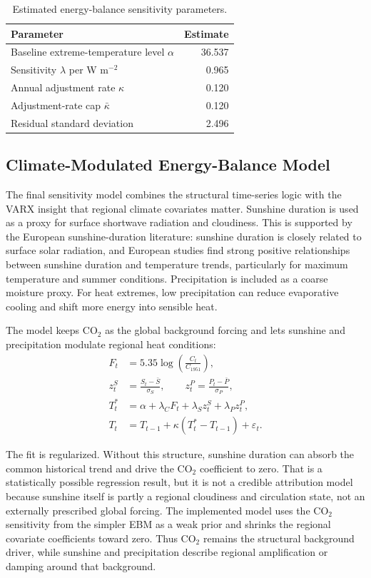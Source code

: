 \documentclass[11pt,a4paper]{article}
\begin{document}
\begin{table}[htbp]
  \centering
  \caption{Estimated energy-balance sensitivity parameters.}
  \label{tab:ebm-parameters}
  \begin{tabular}{lr}
    \toprule
    Parameter & Estimate \\
    \midrule
    Baseline extreme-temperature level $\alpha$ & 36.537 \\
    Sensitivity $\lambda$ per W m$^{-2}$ & 0.965 \\
    Annual adjustment rate $\kappa$ & 0.120 \\
    Adjustment-rate cap $\bar{\kappa}$ & 0.120 \\
    Residual standard deviation & 2.496 \\
    \bottomrule
  \end{tabular}
\end{table}

\subsection{Climate-Modulated Energy-Balance Model}

The final sensitivity model combines the structural time-series logic with the
VARX insight that regional climate covariates matter. Sunshine duration is used
as a proxy for surface shortwave radiation and cloudiness. This is supported by
the European sunshine-duration literature: sunshine duration is closely related
to surface solar radiation, and European studies find strong positive
relationships between sunshine duration and temperature trends, particularly for
maximum temperature and summer conditions. Precipitation is included as a coarse
moisture proxy. For heat extremes, low precipitation can reduce evaporative
cooling and shift more energy into sensible heat.

The model keeps CO$_2$ as the global background forcing and lets sunshine and
precipitation modulate regional heat conditions:
\begin{align}
  F_t &= 5.35 \log\left(\frac{C_t}{C_{1951}}\right), \\
  z^S_t &= \frac{S_t-\bar S}{\sigma_S}, \qquad
  z^P_t = \frac{P_t-\bar P}{\sigma_P}, \\
  T^*_t &= \alpha + \lambda_C F_t + \lambda_S z^S_t + \lambda_P z^P_t, \\
  T_t &= T_{t-1} + \kappa\left(T^*_t - T_{t-1}\right) + \varepsilon_t.
\end{align}

The fit is regularized. Without this structure, sunshine duration can absorb the
common historical trend and drive the CO$_2$ coefficient to zero. That is a
statistically possible regression result, but it is not a credible attribution
model because sunshine itself is partly a regional cloudiness and circulation
state, not an externally prescribed global forcing. The implemented model uses
the CO$_2$ sensitivity from the simpler EBM as a weak prior and shrinks the
regional covariate coefficients toward zero. Thus CO$_2$ remains the structural
background driver, while sunshine and precipitation describe regional
amplification or damping around that background.
\end{document}
